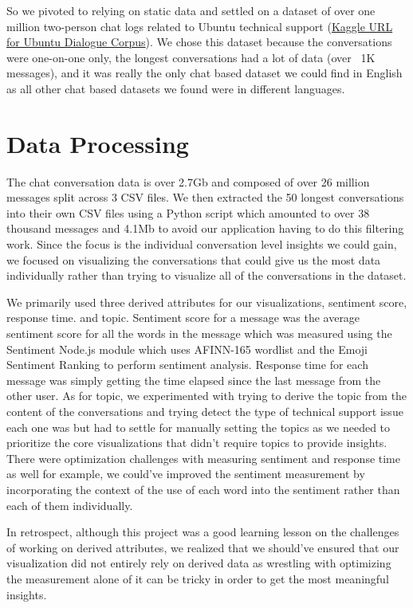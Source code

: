 \documentclass{article}\usepackage{graphicx}
\begin{document}
So we pivoted to relying on static data and settled on a dataset of over one million two-person chat logs related to Ubuntu technical support (\href{https://www.kaggle.com/datasets/rtatman/ubuntu-dialogue-corpus/data}{Kaggle URL for Ubuntu Dialogue Corpus}). We chose this dataset because the conversations were one-on-one only, the longest conversations had a lot of data (over ~1K messages), and it was really the only chat based dataset we could find in English as all other chat based datasets we found were in different languages. 

\section{Data Processing}
The chat conversation data is over 2.7Gb and composed of over 26 million messages split across 3 CSV files. We then extracted the 50 longest conversations into their own CSV files using a Python script which amounted to over 38 thousand messages and 4.1Mb to avoid our application having to do this filtering work. Since the focus is the individual conversation level insights we could gain, we focused on visualizing the conversations that could give us the most data individually rather than trying to visualize all of the conversations in the dataset. 
\newline

We primarily used three derived attributes for our visualizations, sentiment score, response time. and topic. Sentiment score for a message was the average sentiment score for all the words in the message which was measured using the Sentiment Node.js module which uses AFINN-165 wordlist and the Emoji Sentiment Ranking to perform sentiment analysis. Response time for each message was simply getting the time elapsed since the last message from the other user. As for topic, we experimented with trying to derive the topic from the content of the conversations and trying detect the type of technical support issue each one was but had to settle for manually setting the topics as we needed to prioritize the core visualizations that didn't require topics to provide insights. There were optimization challenges with measuring sentiment and response time as well for example, we could've improved the sentiment measurement by incorporating the context of the use of each word into the sentiment rather than each of them individually.
\newline

 In retrospect, although this project was a good learning lesson on the challenges of working on derived attributes, we realized that we should've ensured that our visualization did not entirely rely on derived data as wrestling with optimizing the measurement alone of it can be tricky in order to get the most meaningful insights.
\end{document}
